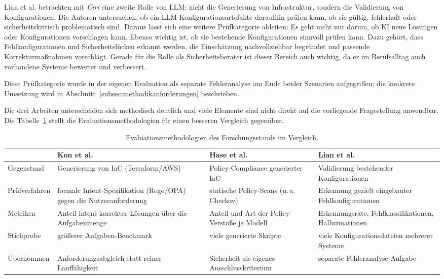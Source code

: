 Lian et al. betrachten mit \emph{Ciri} eine zweite Rolle von \ac{LLM}: nicht die Generierung von Infrastruktur, sondern die Validierung von Konfigurationen. Die Autoren untersuchen, ob ein \ac{LLM} Konfigurationsartefakte daraufhin prüfen kann, ob sie gültig, fehlerhaft oder sicherheitskritisch problematisch sind. \cite{lian2023ciri} Daraus lässt sich eine weitere Prüfkategorie ableiten: Es geht nicht nur darum, ob \ac{KI} neue Lösungen oder Konfigurationen vorschlagen kann. Ebenso wichtig ist, ob sie bestehende Konfigurationen sinnvoll prüfen kann. Dazu gehört, dass Fehlkonfigurationen und Sicherheitslücken erkannt werden, die Einschätzung nachvollziehbar begründet und passende Korrekturmaßnahmen vorschlägt. Gerade für die Rolle als Sicherheitsberater ist dieser Bereich auch wichtig, da er im Berufsalltag auch vorhandene Systeme bewertet und verbessert.

Diese Prüfkategorie wurde in der eigenen Evaluation als separate Fehleranalyse am Ende beider Szenarien aufgegriffen; die konkrete Umsetzung wird in Abschnitt~\ref{subsec:methodikanforderungen} beschrieben.

Die drei Arbeiten unterscheiden sich methodisch deutlich und viele Elemente sind nicht direkt auf die vorliegende Fragestellung anwendbar. Die Tabelle~\ref{tab:forschungsstand-methoden} stellt die Evaluationsmethodologien für einen besseren Vergleich gegenüber.

\begin{table}[htbp]
\centering
\small
\begin{tabular}{p{} p{} p{} p{}}
\hline
 & \textbf{Kon et al.} & \textbf{Hase et al.} & \textbf{Lian et al.} \\
\hline
Gegenstand & Generierung von \ac{IaC} (Terraform/\ac{AWS}) & Policy-Compliance
generierter \ac{IaC} & Validierung bestehender Konfigurationen \\
\addlinespace
Prüfverfahren & formale Intent-Spezifikation (Rego/\acs{OPA}) gegen die
Nutzeranforderung & statische Policy-Scans (u.\,a. Checkov) & Erkennung
gezielt eingebauter Fehlkonfigurationen \\
\addlinespace
Metriken & Anteil intent-korrekter Lösungen über die Aufgabenmenge &
Anteil und Art der Policy-Verstöße je Modell & Erkennungsrate,
Fehlklassifikationen, Halluzinationen \\
\addlinespace
Stichprobe & größerer Aufgaben-Benchmark & viele generierte Skripte & viele
Konfigurationsdateien mehrerer Systeme \\
\addlinespace
Übernommen & Anforderungsabgleich statt reiner Lauffähigkeit & Sicherheit als
eigenes Ausschlusskriterium & separate Fehleranalyse-Aufgabe \\
\hline
\end{tabular}
\caption{Evaluationsmethodologien des Forschungsstands im Vergleich.}
\label{tab:forschungsstand-methoden}
\end{table}

